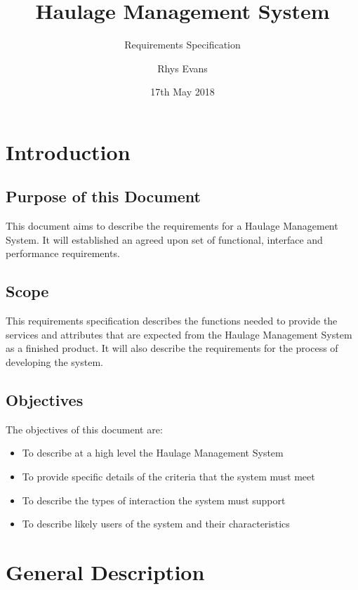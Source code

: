 \documentclass{project}
\begin{document}
\title{Haulage Management System}
\subtitle{Requirements Specification}
\author{Rhys Evans}     
\date{17th May 2018}
\maketitle
\tableofcontents
\newpage

\section{Introduction}
\subsection{Purpose of this Document}
This document aims to describe the requirements for a Haulage Management System. It will established an agreed upon set of functional, interface and performance requirements.

\subsection{Scope}
This requirements specification describes the functions needed to provide the services and attributes that are expected from the Haulage Management System as a finished product. It will also describe the requirements for the process of developing the system.

\subsection{Objectives}
The objectives of this document are:

\begin{itemize}
	\item To describe at a high level the Haulage Management System
	\item To provide specific details of the criteria that the system must meet
	\item To describe the types of interaction the system must support
	\item To describe likely users of the system and their characteristics
\end{itemize}

\newpage

\section{General Description}
\end{document}
